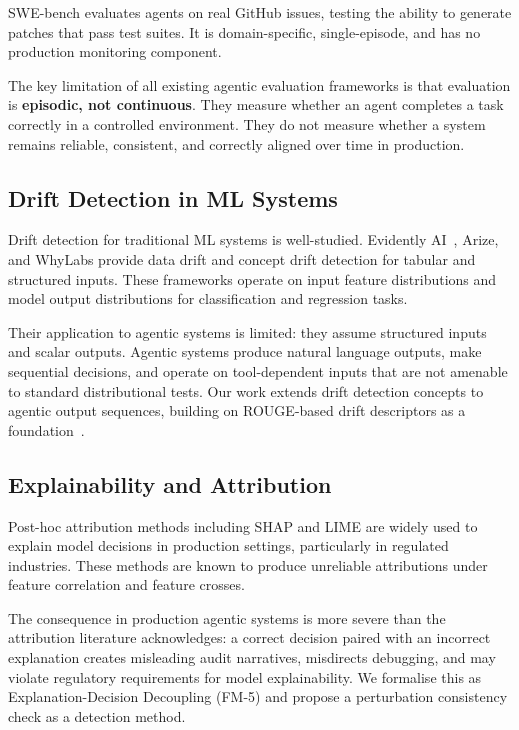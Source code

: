 \documentclass{article}
\begin{document}
SWE-bench \citep{jimenez2024swebench} evaluates agents on real GitHub issues,
testing the ability to generate patches that pass test suites.  It is
domain-specific, single-episode, and has no production monitoring component.

The key limitation of all existing agentic evaluation frameworks is that
evaluation is \textbf{episodic, not continuous}.  They measure whether an agent
completes a task correctly in a controlled environment.  They do not measure
whether a system remains reliable, consistent, and correctly aligned over time
in production.

\subsection{Drift Detection in ML Systems}

Drift detection for traditional ML systems is well-studied.  Evidently
AI~\citep{evidentlyai2023}, Arize, and WhyLabs provide data drift and concept
drift detection for tabular and structured inputs.  These frameworks operate on
input feature distributions and model output distributions for classification
and regression tasks.

Their application to agentic systems is limited: they assume structured inputs
and scalar outputs.  Agentic systems produce natural language outputs, make
sequential decisions, and operate on tool-dependent inputs that are not
amenable to standard distributional tests.  Our work extends drift detection
concepts to agentic output sequences, building on ROUGE-based drift descriptors
as a foundation~\citep{lin2004rouge}.

\subsection{Explainability and Attribution}

Post-hoc attribution methods including SHAP \citep{lundberg2017shap} and
LIME \citep{ribeiro2016lime} are widely used to explain model decisions in
production settings, particularly in regulated industries.  These methods are
known to produce unreliable attributions under feature correlation and feature
crosses.

The consequence in production agentic systems is more severe than the
attribution literature acknowledges: a correct decision paired with an
incorrect explanation creates misleading audit narratives, misdirects
debugging, and may violate regulatory requirements for model explainability.
We formalise this as Explanation-Decision Decoupling (FM-5) and propose a
perturbation consistency check as a detection method.
\end{document}
